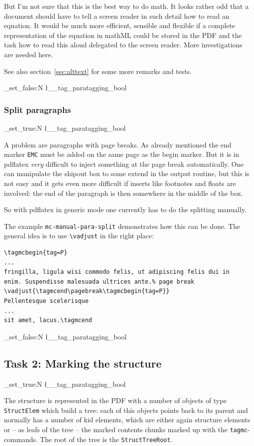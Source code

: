 \documentclass[DIV=12,parskip=half-,bibliography=totoc]{scrartcl}
\newcommand\PDF{PDF}
\newcommand\parataggingON {\bool_set_true:N \l__tag_paratagging_bool}
\newcommand\parataggingOff{\bool_set_false:N \l__tag_paratagging_bool}
\begin{document}
But I'm not sure that this is the best way to do math. It looks rather odd that a document should have to tell a screen reader in such detail how to read an equation. It would be much more efficient, sensible and flexible if a complete representation of the equation in mathML could be stored in the \PDF{} and the task how to read this aloud delegated to the screen reader. More investigations are needed here.

See also section~\ref{sec:alttext} for some more remarks and tests.

\parataggingOff

\subsubsection{Split paragraphs}\label{sec:splitpara}

\parataggingON

A problem are paragraphs with page breaks.  As already mentioned the end marker \texttt{EMC} must be added on the same page as the begin marker. But it is in pdflatex \emph{very} difficult to inject something at the page break automatically. One can manipulate the shipout box to some extend in the output routine, but this is not easy and it gets even more difficult if inserts like footnotes and floats are involved: the end of the paragraph is then somewhere in the middle of the box.

So with pdflatex in generic mode one currently has to do the splitting manually.

The example \texttt{mc-manual-para-split} demonstrates how this can be done. The general idea is to use \verb+\vadjust+ in the right place:


\begin{lstlisting}
\tagmcbegin{tag=P}
...
fringilla, ligula wisi commodo felis, ut adipiscing felis dui in
enim. Suspendisse malesuada ultrices ante.% page break
\vadjust{\tagmcend\pagebreak\tagmcbegin{tag=P}}
Pellentesque scelerisque
...
sit amet, lacus.\tagmcend
\end{lstlisting}

\parataggingOff


\subsection{Task 2: Marking the structure}

\parataggingON

The structure is represented in the \PDF{} with a number of objects of type \texttt{StructElem} which build a tree: each of this objects points back to its parent and normally has a number of kid elements, which are either again structure elements or -- as leafs of the tree -- the marked contents chunks marked up with the \verb+tagmc+-commands. The root of the tree is the \texttt{StructTreeRoot}.
\end{document}
